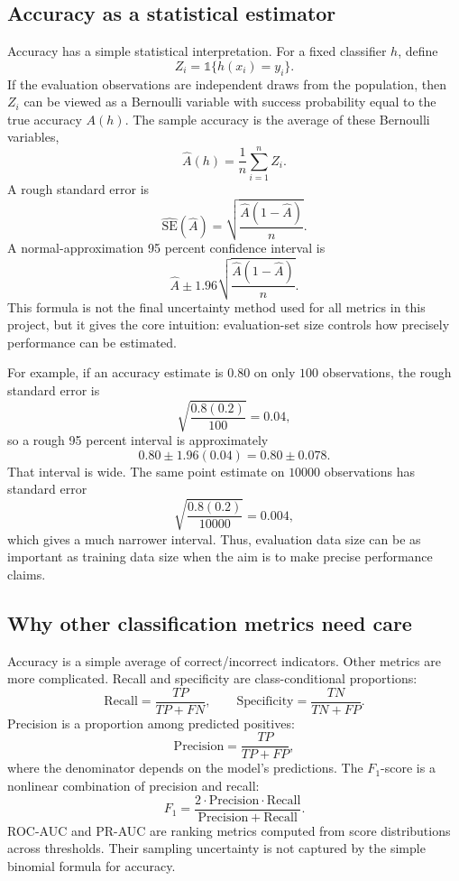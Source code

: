 \subsection{Accuracy as a statistical estimator}

Accuracy has a simple statistical interpretation. For a fixed classifier \(h\), define
\[
Z_i
=
\mathbb{1}\{h(x_i)=y_i\}.
\]
If the evaluation observations are independent draws from the population, then \(Z_i\) can be viewed as a Bernoulli variable with success probability equal to the true accuracy \(A(h)\). The sample accuracy is the average of these Bernoulli variables,
\[
\widehat{A}(h)
=
\frac{1}{n}
\sum_{i=1}^{n} Z_i.
\]
A rough standard error is
\[
\widehat{\mathrm{SE}}(\widehat{A})
=
\sqrt{
\frac{\widehat{A}(1-\widehat{A})}{n}
}.
\]
A normal-approximation 95 percent confidence interval is
\[
\widehat{A}
\pm
1.96
\sqrt{
\frac{\widehat{A}(1-\widehat{A})}{n}
}.
\]
This formula is not the final uncertainty method used for all metrics in this project, but it gives the core intuition: evaluation-set size controls how precisely performance can be estimated.

For example, if an accuracy estimate is \(0.80\) on only \(100\) observations, the rough standard error is
\[
\sqrt{\frac{0.8(0.2)}{100}}=0.04,
\]
so a rough 95 percent interval is approximately
\[
0.80 \pm 1.96(0.04)
=
0.80 \pm 0.078.
\]
That interval is wide. The same point estimate on \(10000\) observations has standard error
\[
\sqrt{\frac{0.8(0.2)}{10000}}=0.004,
\]
which gives a much narrower interval. Thus, evaluation data size can be as important as training data size when the aim is to make precise performance claims.

\subsection{Why other classification metrics need care}

Accuracy is a simple average of correct/incorrect indicators. Other metrics are more complicated. Recall and specificity are class-conditional proportions:
\[
\mathrm{Recall}
=
\frac{TP}{TP+FN},
\qquad
\mathrm{Specificity}
=
\frac{TN}{TN+FP}.
\]
Precision is a proportion among predicted positives:
\[
\mathrm{Precision}
=
\frac{TP}{TP+FP},
\]
where the denominator depends on the model's predictions. The \(F_1\)-score is a nonlinear combination of precision and recall:
\[
F_1
=
\frac{
2\cdot\mathrm{Precision}\cdot\mathrm{Recall}
}{
\mathrm{Precision}+\mathrm{Recall}
}.
\]
ROC-AUC and PR-AUC are ranking metrics computed from score distributions across thresholds. Their sampling uncertainty is not captured by the simple binomial formula for accuracy.

